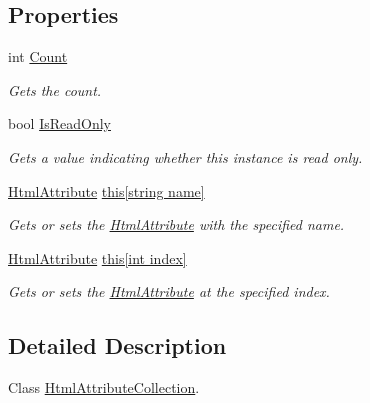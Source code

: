 \subsection*{Properties}
\begin{DoxyCompactItemize}
\item 
int \hyperlink{class_html_agility_pack_1_1_html_attribute_collection_afa0cbd891b38d2d4aad0a4e964dedf10}{Count}
\begin{DoxyCompactList}\small\item\em Gets the count. \end{DoxyCompactList}\item 
bool \hyperlink{class_html_agility_pack_1_1_html_attribute_collection_a809f68d2a99ac2d8bbaaa693d7f12f15}{Is\+Read\+Only}
\begin{DoxyCompactList}\small\item\em Gets a value indicating whether this instance is read only. \end{DoxyCompactList}\item 
\hyperlink{class_html_agility_pack_1_1_html_attribute}{Html\+Attribute} \hyperlink{class_html_agility_pack_1_1_html_attribute_collection_a928e95249a940b48a9bb7f1bf13b1294}{this\mbox{[}string name\mbox{]}}
\begin{DoxyCompactList}\small\item\em Gets or sets the \hyperlink{class_html_agility_pack_1_1_html_attribute}{Html\+Attribute} with the specified name. \end{DoxyCompactList}\item 
\hyperlink{class_html_agility_pack_1_1_html_attribute}{Html\+Attribute} \hyperlink{class_html_agility_pack_1_1_html_attribute_collection_a13f6ce378228e69df507f25f9efd7380}{this\mbox{[}int index\mbox{]}}
\begin{DoxyCompactList}\small\item\em Gets or sets the \hyperlink{class_html_agility_pack_1_1_html_attribute}{Html\+Attribute} at the specified index. \end{DoxyCompactList}\end{DoxyCompactItemize}


\subsection{Detailed Description}
Class \hyperlink{class_html_agility_pack_1_1_html_attribute_collection}{Html\+Attribute\+Collection}. 

